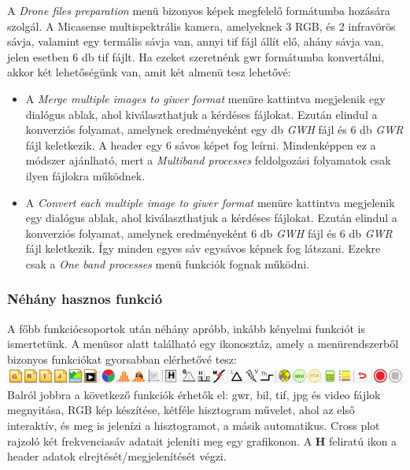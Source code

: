 \documentclass[a4paper,12pt]{article}
\begin{document}
A \textit{Drone files preparation} menü bizonyos képek megfelelő formátumba hozására szolgál. A Micasense multispektrális kamera, amelyeknek 3 RGB, és 2 infravörös sávja, valamint egy termális sávja van, annyi tif fájl állít elő, ahány sávja van, jelen esetben 6 db tif fájlt. Ha ezeket szeretnénk gwr formátumba konvertálni, akkor két lehetőségünk van, amit két almenü tesz lehetővé:
\begin{itemize}
	\item A \textit{Merge multiple images to giwer format} menüre kattintva megjelenik egy dialógus ablak, ahol kiválaszthatjuk a kérdéses fájlokat. Ezután elindul a konverziós folyamat, amelynek eredményeként egy db \textit{GWH} fájl és 6 db \textit{GWR} fájl keletkezik. A header egy 6 sávos képet fog leírni. Mindenképpen ez a módszer ajánlható, mert a \textit{Multiband processes} feldolgozási folyamatok csak ilyen fájlokra működnek.
	
	\item A \textit{Convert each multiple image to giwer format} menüre kattintva megjelenik egy dialógus ablak, ahol kiválaszthatjuk a kérdéses fájlokat. Ezután elindul a konverziós folyamat, amelynek eredményeként 6 db \textit{GWH} fájl és 6 db \textit{GWR} fájl keletkezik. Így minden egyes sáv egysávos képnek fog látszani. Ezekre csak a \textit{One band processes} menü funkciók fognak működni.
\end{itemize}

\subsubsection{Néhány hasznos funkció}

A főbb funkciócsoportok után néhány apróbb, inkább kényelmi funkciót is ismertetünk. A menüsor alatt található egy ikonosztáz, amely a menürendszerből bizonyos funkciókat gyorsabban elérhetővé tesz:\\
\includegraphics[height=0.55cm]{ikonosztaz.png} \\Balról jobbra a következő funkciók érhetők el: gwr, bil, tif, jpg és video fájlok megnyitása, RGB kép készítése, kétféle hisztogram művelet, ahol az első interaktív, és meg is jelenízi a hisztogramot, a másik automatikus. Cross plot rajzoló két frekvenciasáv adatait jeleníti meg egy grafikonon. A \textbf{H} feliratú ikon a header adatok elrejtését/megjelenítését végzi. 
\end{document}
